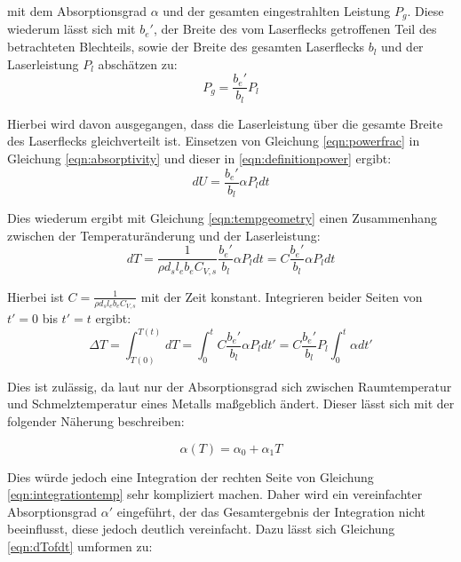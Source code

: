 mit dem Absorptionsgrad $\alpha$ und der gesamten eingestrahlten Leistung $P_g$. Diese wiederum lässt sich mit $b_e'$, der Breite des vom Laserflecks getroffenen Teil des betrachteten Blechteils, sowie der Breite des gesamten Laserflecks $b_l$ und der Laserleistung $P_l$ abschätzen zu:
\begin{equation}
  P_g = \frac{b_e'}{b_l}P_l
  \label{eqn:powerfrac}
\end{equation}

Hierbei wird davon ausgegangen, dass die Laserleistung über die gesamte Breite des Laserflecks gleichverteilt ist. Einsetzen von Gleichung \ref{eqn:powerfrac} in Gleichung \ref{eqn:absorptivity} und dieser in \ref{eqn:definitionpower} ergibt:
\begin{equation}
  dU = \frac{b_e'}{b_l}\alpha P_l dt
  \label{eqn:energyofpower}
\end{equation} 

Dies wiederum ergibt mit Gleichung \ref{eqn:tempgeometry} einen Zusammenhang zwischen der Temperaturänderung und der Laserleistung:
\begin{equation}
  dT = \frac{1}{\rho d_s l_e b_eC_{V,s}} \frac{b_e'}{b_l}\alpha P_l dt = C \frac{b_e'}{b_l}\alpha P_l dt
  \label{eqn:dTofdt}
\end{equation}

Hierbei ist $C = \frac{1}{\rho d_s l_e b_eC_{V,s}}$ mit der Zeit konstant. Integrieren beider Seiten von $t'=0$ bis $t'=t$ ergibt:
\begin{equation}
  \Delta T = \int_{T(0)}^{T(t)} dT = \int_{0}^{t} C \frac{b_e'}{b_l}\alpha P_l dt' = C \frac{b_e'}{b_l} P_l \int_{0}^{t} \alpha dt'
  \label{eqn:integrationtemp}
\end{equation}

Dies ist zulässig, da laut \cite{laserheating} nur der Absorptionsgrad sich zwischen Raumtemperatur und Schmelztemperatur eines Metalls maßgeblich ändert. Dieser lässt sich mit der folgender Näherung beschreiben:

\begin{equation}
\alpha(T) = \alpha_0 + \alpha_1 T
\end{equation}

Dies würde jedoch eine Integration der rechten Seite von Gleichung \ref{eqn:integrationtemp} sehr kompliziert machen. Daher wird ein vereinfachter Absorptionsgrad $\alpha'$ eingeführt, der das Gesamtergebnis der Integration nicht beeinflusst, diese jedoch deutlich vereinfacht. Dazu lässt sich Gleichung \ref{eqn:dTofdt} umformen zu:

